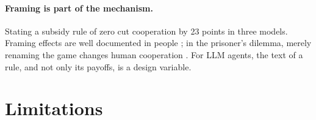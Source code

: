 \documentclass[11pt]{article}
\theoremstyle{definition}
\theoremstyle{remark}
\begin{document}
\paragraph{Framing is part of the mechanism.} Stating a subsidy rule of zero cut cooperation by
23 points in three models. Framing effects are well documented in people \citep{tversky1981framing}; in the prisoner's
dilemma, merely renaming the game changes human cooperation \citep{liberman2004name}. For LLM
agents, the text of a rule, and not only its payoffs, is a design variable.

\section{Limitations}\label{sec:limitations}
\end{document}
